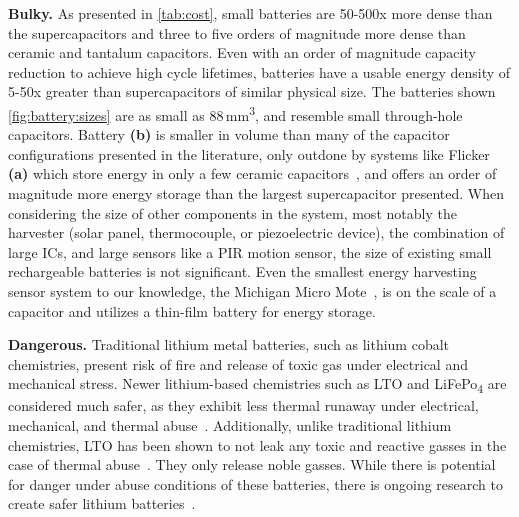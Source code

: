 \vspace{-6pt}
\noindent
\textbf{Bulky.}
As presented in \cref{tab:cost}, small batteries are 50-500x more dense than the supercapacitors and
three to five orders of magnitude more dense than ceramic and tantalum capacitors.
Even with an order of magnitude capacity reduction to achieve high cycle
lifetimes, batteries have a usable energy density of 5-50x greater than supercapacitors
of similar physical size.  The batteries shown \cref{fig:battery:sizes} are
as small as 88\,mm\textsuperscript{3}, and resemble small through-hole
capacitors. Battery \textbf{(b)} is smaller in volume than many of the capacitor
configurations presented in the literature, only outdone by systems like
Flicker \textbf{(a)} which store energy in only a few ceramic capacitors~\cite{hesterFlicker17},
and offers an order of
magnitude more energy storage than the largest supercapacitor presented. When
considering the size of other components in the system, most notably the
harvester (solar panel, thermocouple, or piezoelectric device), the combination
of large ICs, and large sensors like a PIR motion sensor, the size
of existing small rechargeable batteries is not significant.
Even the smallest energy harvesting sensor system to our knowledge,
the Michigan Micro Mote~\cite{lee13modular}, is on the
scale of a capacitor and utilizes a thin-film battery for energy storage.
\\


\vspace{-6pt}
\noindent
\textbf{Dangerous.} Traditional lithium metal batteries, such as
lithium cobalt chemistries, present risk of fire
and release of toxic gas under electrical and mechanical stress. Newer lithium-based
chemistries such as LTO and LiFePo\textsubscript{4} are considered much safer,
as they exhibit less thermal runaway under electrical, mechanical, and thermal
abuse~\cite{belharouakElectrochemistry11, larssonAbuse14}. Additionally,
unlike traditional lithium chemistries, LTO has been shown to not leak
any toxic and reactive gasses in the case of thermal abuse~\cite{belharouakElectrochemistry11}. They only release noble gasses.
While there is potential for danger under abuse conditions of these batteries,
there is ongoing research to create safer lithium batteries~\cite{larssonAbuse14}.

